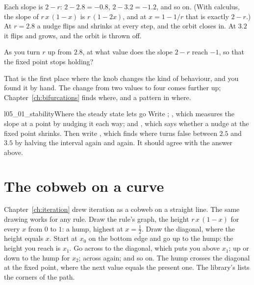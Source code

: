 
\noindent
Each slope is $2 - r$: $2 - \num{2.8} = \num{-0.8}$,
$2 - \num{3.2} = \num{-1.2}$, and so on. (With calculus, the slope of
$r\,x\,(1 - x)$ is $r\,(1 - 2x)$, and at $x = 1 - 1/r$ that is exactly
$2 - r$.) At $r = \num{2.8}$ a nudge flips and shrinks at every step, and
the orbit closes in. At $\num{3.2}$ it flips and grows, and the orbit is
thrown off.

\begin{think}
As you turn $r$ up from $\num{2.8}$, at what value does the slope $2 - r$
reach $-1$, so that the fixed point stops holding?
\end{think}

\noindent
That is the first place where the knob changes the kind of behaviour, and
you found it by hand. The change from two values to four comes further up;
Chapter~\ref{ch:bifurcations} finds where, and a pattern in where.

\begin{lab}{l05_01_stability}{Where the steady state lets go}
Write ; , which measures the slope at a
point by nudging it each way; and , which says whether a nudge
at the fixed point shrinks. Then write , which finds where
 turns false between $\num{2.5}$ and $\num{3.5}$ by halving the
interval again and again. It should agree with the answer above.
\end{lab}

\section{The cobweb on a curve}
\label{sec:ch05-cobweb}

\noindent
Chapter~\ref{ch:iteration} drew iteration as a cobweb on a straight line.
The same drawing works for any rule. Draw the rule's graph, the height
$r\,x\,(1 - x)$ for every $x$ from $0$ to $1$: a hump, highest at
$x = \tfrac12$. Draw the diagonal, where the height equals $x$. Start at
$x_0$ on the bottom edge and go up to the hump: the height you reach is
$x_1$. Go across to the diagonal, which puts you above $x_1$; up or down to
the hump for $x_2$; across again; and so on. The hump crosses the diagonal
at the fixed point, where the next value equals the present one. The
library's  lists the corners of the path.


